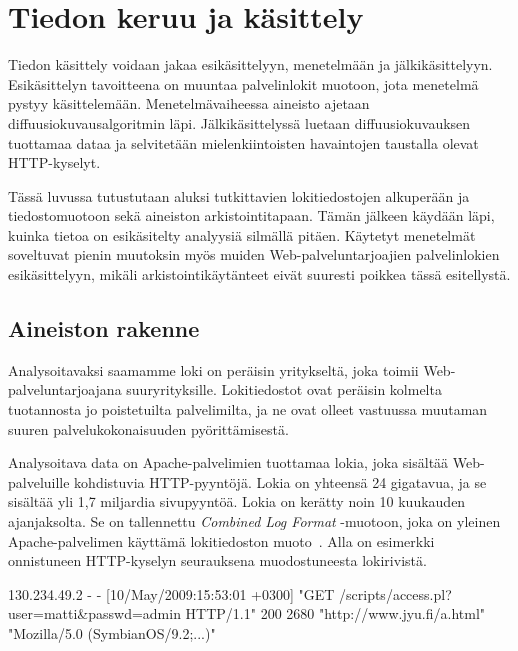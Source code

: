 
\chapter{Tiedon keruu ja käsittely}

Tiedon käsittely voidaan jakaa esikäsittelyyn, menetelmään ja
jälkikäsittelyyn. Esikäsittelyn tavoitteena on muuntaa palvelinlokit
muotoon, jota menetelmä pystyy käsittelemään. Menetelmävaiheessa
aineisto ajetaan diffuusiokuvausalgoritmin läpi. Jälkikäsittelyssä
luetaan diffuusiokuvauksen tuottamaa dataa ja selvitetään
mielenkiintoisten havaintojen taustalla olevat HTTP-kyselyt.

Tässä luvussa tutustutaan aluksi tutkittavien lokitiedostojen
alkuperään ja tiedostomuotoon sekä aineiston arkistointitapaan. Tämän
jälkeen käydään läpi, kuinka tietoa on esikäsitelty analyysiä silmällä
pitäen. Käytetyt menetelmät soveltuvat pienin muutoksin myös muiden
Web-palveluntarjoajien palvelinlokien esikäsittelyyn, mikäli
arkistointikäytänteet eivät suuresti poikkea tässä esitellystä.

\section{Aineiston rakenne}
\label{sec:lahtokohta}

Analysoitavaksi saamamme loki on peräisin yritykseltä, joka toimii
Web-\-palveluntarjoajana suuryrityksille. Lokitiedostot ovat peräisin
kolmelta tuotannosta jo poistetuilta palvelimilta, ja ne ovat olleet
vastuussa muutaman suuren palvelukokonaisuuden pyörittämisestä.

Analysoitava data on Apache-palvelimien tuottamaa lokia, joka sisältää
Web-palveluille kohdistuvia HTTP-pyyntöjä. Lokia on yhteensä 24
gigatavua, ja se sisältää yli 1,7 miljardia sivupyyntöä.
Lokia on kerätty noin 10 kuukauden
ajanjaksolta. Se on tallennettu \textit{Combined Log Format} -muotoon,
joka on yleinen Apache-palvelimen käyttämä lokitiedoston
muoto~\cite{combined}. Alla on esimerkki onnistuneen HTTP-kyselyn seurauksena muodostuneesta lokirivistä.


\begin{framed}
\begin{verbatim*}
130.234.49.2 - - [10/May/2009:15:53:01 +0300]
"GET /scripts/access.pl?user=matti&passwd=admin HTTP/1.1"
200 2680 "http://www.jyu.fi/a.html"
"Mozilla/5.0 (SymbianOS/9.2;...)"
\end{verbatim*}
\end{framed}

